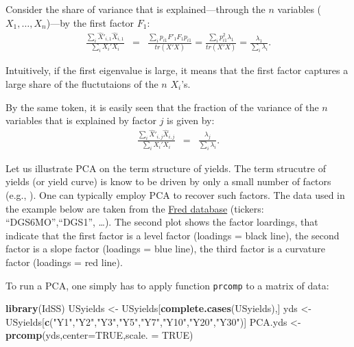 \documentclass[
  11pt,
]{book}
\newenvironment{Shaded}{\begin{snugshade}}{\end{snugshade}}
\newcommand{\AttributeTok}[1]{\textcolor[rgb]{0.13,0.29,0.53}{#1}}
\newcommand{\ConstantTok}[1]{\textcolor[rgb]{0.56,0.35,0.01}{#1}}
\newcommand{\FunctionTok}[1]{\textcolor[rgb]{0.13,0.29,0.53}{\textbf{#1}}}
\newcommand{\NormalTok}[1]{#1}
\newcommand{\OtherTok}[1]{\textcolor[rgb]{0.56,0.35,0.01}{#1}}
\newcommand{\StringTok}[1]{\textcolor[rgb]{0.31,0.60,0.02}{#1}}
\theoremstyle{definition}
\theoremstyle{definition}
\theoremstyle{definition}
\theoremstyle{definition}
\theoremstyle{remark}
\begin{document}
Consider the share of variance that is explained---through the \(n\) variables (\(X_{1},\ldots,X_{n}\))---by the first factor \(F_{1}\):
\begin{eqnarray*}
\frac{\sum_{i}\hat{X}'_{i,1}\hat{X}_{i,1}}{\sum_{i}X_{i}'X_{i}} & = & \frac{\sum_{i}p_{i1}F'_{1}F_{1}p_{i1}}{tr(X'X)} = \frac{\sum_{i}p_{i1}^{2}\lambda_{1}}{tr(X'X)} = \frac{\lambda_{1}}{\sum_{i}\lambda_{i}}.
\end{eqnarray*}

Intuitively, if the first eigenvalue is large, it means that the first factor captures a large share of the fluctutaions of the \(n\) \(X_{i}\)'s.

By the same token, it is easily seen that the fraction of the variance of the \(n\) variables that is explained by factor \(j\) is given by:
\begin{eqnarray*}
\frac{\sum_{i}\hat{X}'_{i,j}\hat{X}_{i,j}}{\sum_{i}X_{i}'X_{i}} & = & \frac{\lambda_{j}}{\sum_{i}\lambda_{i}}.
\end{eqnarray*}

Let us illustrate PCA on the term structure of yields. The term strucutre of yields (or yield curve) is know to be driven by only a small number of factors (e.g., \citet{Litterman_Scheinkman_1991}). One can typically employ PCA to recover such factors. The data used in the example below are taken from the \href{https://fred.stlouisfed.org}{Fred database} (tickers: ``DGS6MO'',``DGS1'', \ldots). The second plot shows the factor loardings, that indicate that the first factor is a level factor (loadings = black line), the second factor is a slope factor (loadings = blue line), the third factor is a curvature factor (loadings = red line).

To run a PCA, one simply has to apply function \texttt{prcomp} to a matrix of data:

\begin{Shaded}
\begin{Highlighting}[]
\FunctionTok{library}\NormalTok{(IdSS)}
\NormalTok{USyields }\OtherTok{\textless{}{-}}\NormalTok{ USyields[}\FunctionTok{complete.cases}\NormalTok{(USyields),]}
\NormalTok{yds }\OtherTok{\textless{}{-}}\NormalTok{ USyields[}\FunctionTok{c}\NormalTok{(}\StringTok{"Y1"}\NormalTok{,}\StringTok{"Y2"}\NormalTok{,}\StringTok{"Y3"}\NormalTok{,}\StringTok{"Y5"}\NormalTok{,}\StringTok{"Y7"}\NormalTok{,}\StringTok{"Y10"}\NormalTok{,}\StringTok{"Y20"}\NormalTok{,}\StringTok{"Y30"}\NormalTok{)]}
\NormalTok{PCA.yds }\OtherTok{\textless{}{-}} \FunctionTok{prcomp}\NormalTok{(yds,}\AttributeTok{center=}\ConstantTok{TRUE}\NormalTok{,}\AttributeTok{scale. =} \ConstantTok{TRUE}\NormalTok{)}
\end{Highlighting}
\end{Shaded}
\end{document}
